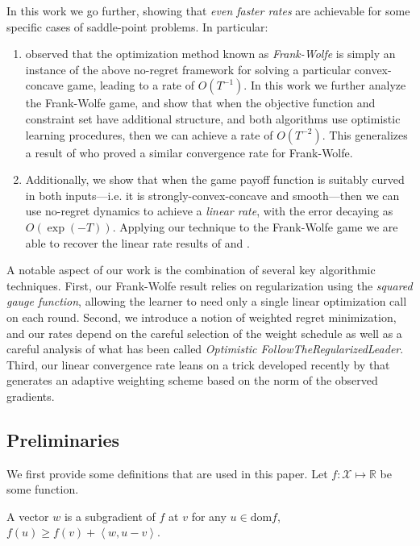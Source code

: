 \documentclass[final,12pt]{colt2018} %
\def\reals{\mathbb{R}}
\def\reals{\mathbb{R}}
\newcommand{\lr}[2]{\left\langle#1,#2\right\rangle}
\newcommand{\XX}{\mathcal{X}}
\begin{document}
In this work we go further, showing that \emph{even faster rates} are achievable for some specific cases of saddle-point problems. In particular:
\begin{enumerate}[itemsep=0mm]
	\item \citet{AW17} observed that the optimization method known as \emph{Frank-Wolfe} is simply an instance of the above no-regret framework for solving a particular convex-concave game, leading to a rate of $O(T^{-1})$. In this work we further analyze the Frank-Wolfe game, and
	show that when the objective function and constraint set have additional structure, and both algorithms use optimistic learning procedures, then we can achieve a rate of $O(T^{-2})$. This generalizes a result of \citet{D15} who proved a similar convergence rate for Frank-Wolfe.
  \item Additionally, we show that when the game payoff function is suitably curved in both inputs---i.e. it is strongly-convex-concave and smooth---then we can use no-regret dynamics to achieve a \emph{linear rate}, with the error decaying as $O(\exp(-T))$. Applying our technique to the  {Frank-Wolfe} game we are able 
to recover the linear rate  results of \citet{LP66,DR70} and \cite{D79}. 
	
	
\end{enumerate}
A notable aspect of our work is the combination of several key algorithmic techniques. First, our  Frank-Wolfe result relies on regularization using the \emph{squared gauge function}, allowing the learner to need only a single linear optimization call on each round. Second, we introduce a notion of weighted regret minimization, and our rates depend on the careful selection of the weight schedule as well as a careful analysis of what has been called \emph{Optimistic FollowTheRegularizedLeader}. Third, our linear convergence rate leans on a trick developed recently by \citet{L17} that generates an adaptive weighting scheme based on the norm of the observed gradients.


\subsection{Preliminaries} \label{Pre}

We first provide some definitions that are used in this paper. Let $f:\XX \mapsto \reals$ be some function.

\begin{definition}
	A vector $w$ is a subgradient of $f$ at $v$ for any $u \in \text{dom} f$, $f(u) \ge f(v) + \lr{w}{u-v}$. 
\end{definition}
\end{document}
